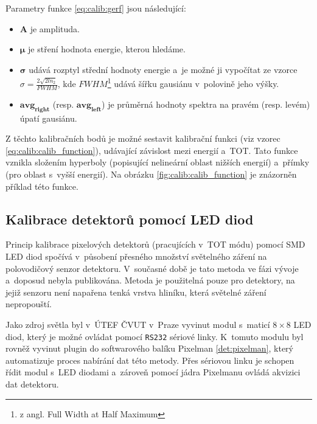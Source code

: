 Parametry funkce \ref{eq:calib:gerf} jsou následující:
\begin{itemize}
	\item $\mathbf{A}$ je amplituda.
	\item $\mathbf{\mu}$ je stření hodnota energie, kterou hledáme.
	\item $\mathbf{\sigma}$ udává rozptyl střední hodnoty energie a~je možné ji vypočítat ze vzorce 
		$\sigma = \frac{2\sqrt{2ln_2}}{FWHM}$, kde $FWHM$\footnote{z angl. Full Width at Half Maximum} udává šířku gausiánu v~polovině jeho výšky.
	\item $\mathbf{avg_{right}}$ (resp. $\mathbf{avg_{left}}$) je průměrná hodnoty spektra na pravém (resp. levém) úpatí gausiánu.
\end{itemize}

Z těchto kalibračních bodů je možné sestavit kalibrační funkci (viz vzorec \ref{eq:calib:calib_function}), udávající závislost mezi energií a~TOT. Tato funkce vznikla složením hyperboly (popisující nelineární oblast nižších energií) a~přímky (pro oblast s~vyšší energií). Na obrázku \ref{fig:calib:calib_function} je znázorněn příklad této funkce.


\subsection{Kalibrace detektorů pomocí LED diod}\label{calib:led}
Princip kalibrace pixelových detektorů (pracujících v~TOT módu) pomocí SMD LED diod spočívá v~působení přesného množství světelného záření na polovodičový senzor detektoru. V~současné době je tato metoda ve fázi vývoje a~doposud nebyla publikována. Metoda je použitelná pouze pro detektory, na jejiž senzoru není napařena tenká vrstva hliníku, která světelné záření nepropouští. 

Jako zdroj světla byl v~ÚTEF ČVUT v~Praze vyvinut modul s~maticí $8\times8$ LED diod, který je možné ovládat pomocí \texttt{RS232} sériové linky. K~tomuto modulu byl rovněž vyvinut plugin do softwarového balíku Pixelman \ref{det:pixelman}, který automatizuje proces nabírání dat této metody. Přes sériovou linku je schopen řídit modul s~LED diodami a~zároveň pomocí jádra Pixelmanu ovládá akvizici dat detektoru.

